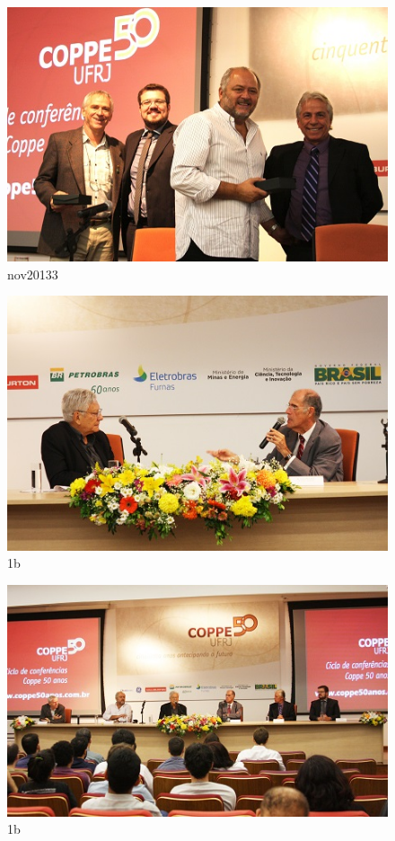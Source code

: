 \begin{figure}[h!]
  \centering
  \includegraphics[width=1\linewidth]{Fotos/Solenidade/3.jpg}
  \caption{nov20133}
  \label{nov20133}
\end{figure}

\begin{figure}[h!]
  \centering
  \includegraphics[width=1\linewidth]{Fotos/Solenidade/4.jpg}
  \caption{1b}
  \label{nov20134}
\end{figure}

\begin{figure}[h!]
  \centering
  \includegraphics[width=1\linewidth]{Fotos/Solenidade/5.jpg}
  \caption{1b}
  \label{nov20134}
\end{figure}

